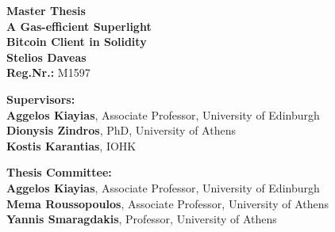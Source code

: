 \begin{center}
    \vspace{3cm}
    \large \textbf{Master Thesis}\\
    \vspace{3cm}
    \textbf{A Gas-efficient Superlight\\Bitcoin Client in Solidity}\\
    \vspace{3cm}
    \large \textbf{Stelios Daveas}\\
    \textbf{Reg.Nr.:} M1597

    \vspace{5cm}
    \begin{flushleft}
        \textbf{Supervisors:}\\
        \hspace{2cm}
        \textbf{Aggelos Kiayias}, Associate Professor, University of Edinburgh\\
        \hspace{2cm}
        \textbf{Dionysis Zindros}, PhD, University of Athens\\
        \hspace{2cm}
        \textbf{Kostis Karantias}, IOHK

        \vspace{1cm}

        \textbf{Thesis Committee:}\\
        \hspace{2cm}
        \textbf{Aggelos Kiayias}, Associate Professor, University of Edinburgh\\
        \hspace{2cm}
        \textbf{Mema Roussopoulos}, Associate Professor, University of Athens\\
        \hspace{2cm}
        \textbf{Yannis Smaragdakis}, Professor, University of Athens

    \end{flushleft}
\end{center}
\pagebreak
